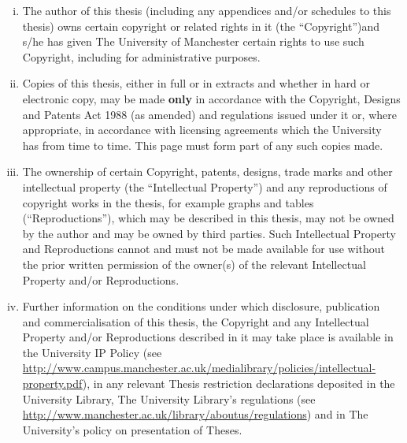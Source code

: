 \begin{enumerate}[i.]
  \item The author of this thesis (including any appendices and/or schedules to this thesis) owns certain copyright or related rights in it (the  “Copyright”)and s/he has given The University of Manchester certain rights to use such Copyright, including for administrative purposes.
  \item Copies of this thesis, either in full or in extracts and whether in hard or electronic copy, may be made \textbf{only} in accordance with the Copyright, Designs and Patents Act 1988 (as amended) and regulations issued under it or, where appropriate, in accordance with licensing agreements which the University has from time to time. This page must form part of any such copies made.
  \item The ownership of certain Copyright, patents, designs, trade marks and other
intellectual property (the “Intellectual Property”) and any reproductions of copyright works in the thesis, for example graphs and tables (“Reproductions”), which may be described in this thesis, may not be owned by the author and may be owned by third parties. Such Intellectual Property and Reproductions cannot and must not be made available for use without the prior written permission of the owner(s) of the relevant Intellectual Property and/or Reproductions.
  \item Further information on the conditions under which disclosure, publication and commercialisation of this thesis, the Copyright and any Intellectual Property and/or Reproductions described in it may take place is available in the University IP Policy (see \url{http://www.campus.manchester.ac.uk/medialibrary/policies/intellectual-property.pdf}), in any relevant \newline Thesis restriction declarations deposited in the University Library, The University    Library’s regulations (see \url{http://www.manchester.ac.uk/library/aboutus/regulations}) and in The University’s policy on presentation of Theses.
\end{enumerate}
